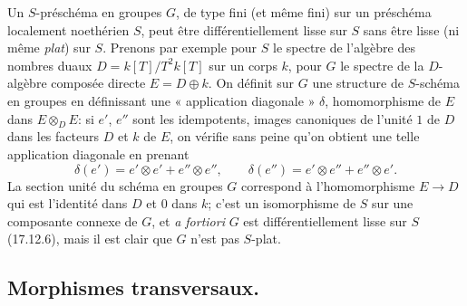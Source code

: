 \begin{remark}[17.12.8]
\label{IV.17.12.8}
Un $S$-préschéma en groupes $G$, de type fini (et même fini) sur un préschéma localement noethérien $S$, peut être différentiellement lisse sur $S$ sans être lisse (ni même \emph{plat}) sur $S$. Prenons par exemple pour $S$ le spectre de l'algèbre des nombres duaux $D=k[T]/T^2k[T]$ sur un corps $k$, pour $G$ le spectre de la $D$-algèbre composée directe $E=D\oplus k$. On définit sur $G$ une structure de $S$-schéma en groupes en définissant une « application diagonale » $\delta$, homomorphisme de $E$ dans $E\otimes_DE$: si $e'$, $e''$ sont les idempotents, images canoniques de l'unité $1$ de $D$ dans les facteurs $D$ et $k$ de $E$, on vérifie sans peine qu'on obtient une telle application diagonale en prenant
\[
\delta(e')=e'\otimes e'+e''\otimes e'',\qquad
\delta(e'')=e'\otimes e''+e''\otimes e'.
\]
La section unité du schéma en groupes $G$ correspond à l'homomorphisme $E\to D$ qui est l'identité dans $D$ et $0$ dans $k$; c'est un isomorphisme de $S$ sur une composante connexe de $G$, et \emph{a fortiori} $G$ est différentiellement lisse sur $S$ (17.12.6), mais il est clair que $G$ n'est pas $S$-plat.
\end{remark}

\subsection{Morphismes transversaux.}
\label{subsection:IV.17.13}
\label{IV.17.13}

